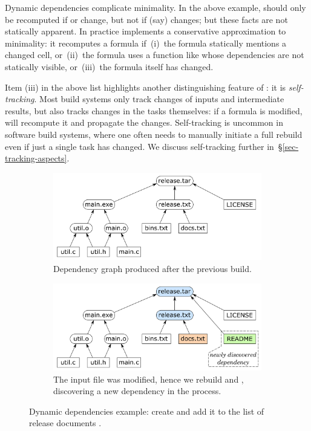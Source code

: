 Dynamic dependencies complicate minimality.  In the above example, 
should only be recomputed if  or  change, but not if (say)
 changes; but these facts are not statically apparent. In practice
\Excel implements a conservative approximation to minimality: it recomputes a
formula if~(i)~the formula statically mentions a changed cell, or~(ii)~the formula uses a
function like  whose dependencies are not statically visible,
or~(iii)~the formula itself has changed.

Item (iii) in the above list highlights another distinguishing feature of \Excel: it
is \emph{self-tracking}. Most build systems only track changes of inputs and
intermediate results, but \Excel also tracks changes in the tasks themselves: if
a formula is modified, \Excel will recompute it and propagate the changes.
Self-tracking is uncommon in software build systems, where one often needs to
manually initiate a full rebuild even if just a single task has changed.
We discuss self-tracking further in~\S\ref{sec-tracking-aspects}.

\begin{figure}
\begin{subfigure}[b]{0.90\linewidth}
\centerline{\includegraphics[scale=0.28]{fig/shake-example.pdf}}
\caption{Dependency graph produced after the previous build.}
\end{subfigure}
\begin{subfigure}[b]{0.90\linewidth}
\vspace{1mm}
\centerline{\includegraphics[scale=0.28]{fig/shake-example-rebuild.pdf}}
\caption{The input file  was modified, hence we rebuild
 and , discovering a new dependency
 in the process.}
\end{subfigure}
\caption{Dynamic dependencies example: create  and add it to the
list of release documents .\label{fig-shake}}
\end{figure}

